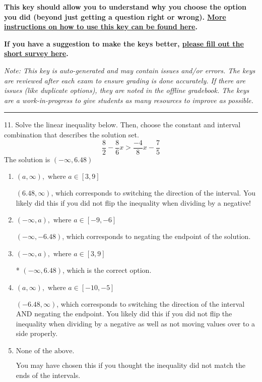 \documentclass{extbook}[14pt]
\begin{document}
\textbf{This key should allow you to understand why you choose the option you did (beyond just getting a question right or wrong). \href{https://xronos.clas.ufl.edu/mac1105spring2020/courseDescriptionAndMisc/Exams/LearningFromResults}{More instructions on how to use this key can be found here}.}

\textbf{If you have a suggestion to make the keys better, \href{https://forms.gle/CZkbZmPbC9XALEE88}{please fill out the short survey here}.}

\textit{Note: This key is auto-generated and may contain issues and/or errors. The keys are reviewed after each exam to ensure grading is done accurately. If there are issues (like duplicate options), they are noted in the offline gradebook. The keys are a work-in-progress to give students as many resources to improve as possible.}

\rule{\textwidth}{0.4pt}

11. Solve the linear inequality below. Then, choose the constant and interval combination that describes the solution set.
\[ \frac{8}{2} - \frac{8}{6} x > \frac{-4}{8} x - \frac{7}{5} \] 
The solution is $ (-\infty, 6.48) $ 

\begin{enumerate}[label=\Alph*.] 
\item $ (a, \infty), \text{ where } a \in [3, 9] $ 

  $(6.48, \infty)$, which corresponds to switching the direction of the interval. You likely did this if you did not flip the inequality when dividing by a negative! 
\item $ (-\infty, a), \text{ where } a \in [-9, -6] $ 

  $(-\infty, -6.48)$, which corresponds to negating the endpoint of the solution. 
\item $ (-\infty, a), \text{ where } a \in [3, 9] $ 

 * $(-\infty, 6.48)$, which is the correct option. 
\item $ (a, \infty), \text{ where } a \in [-10, -5] $ 

  $(-6.48, \infty)$, which corresponds to switching the direction of the interval AND negating the endpoint. You likely did this if you did not flip the inequality when dividing by a negative as well as not moving values over to a side properly. 
\item $ \text{None of the above}. $ 

 You may have chosen this if you thought the inequality did not match the ends of the intervals. 
\end{enumerate} 
 
\end{document}
